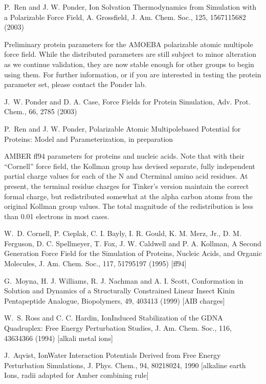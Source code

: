 \documentclass[letterpaper,11pt,english]{sphinxmanual}
\begin{document}
P. Ren and J. W. Ponder, Ion Solvation Thermodynamics from Simulation with a Polarizable Force Field, A. Grossfield, J. Am. Chem. Soc., 125, 15671\sphinxhyphen{}15682 (2003)


Preliminary protein parameters for the AMOEBA polarizable atomic multipole force field. While the distributed parameters are still subject to minor alteration as we continue validation, they are now stable enough for other groups to begin using them. For further information, or if you are interested in testing the protein parameter set, please contact the Ponder lab.

J. W. Ponder and D. A. Case, Force Fields for Protein Simulation, Adv. Prot. Chem., 66, 27\sphinxhyphen{}85 (2003)

P. Ren and J. W. Ponder, Polarizable Atomic Multipole\sphinxhyphen{}based Potential for Proteins: Model and Parameterization, in preparation


AMBER ff94 parameters for proteins and nucleic acids. Note that with their “Cornell” force field, the Kollman group has devised separate, fully independent partial charge values for each of the N\sphinxhyphen{} and C\sphinxhyphen{}terminal amino acid residues. At present, the terminal residue charges for Tinker’s version maintain the correct formal charge, but redistributed somewhat at the alpha carbon atoms from the original Kollman group values. The total magnitude of the redistribution is less than 0.01 electrons in most cases.

W. D. Cornell, P. Cieplak, C. I. Bayly, I. R. Gould, K. M. Merz, Jr., D. M. Ferguson, D. C. Spellmeyer, T. Fox, J. W. Caldwell and P. A. Kollman, A Second Generation Force Field for the Simulation of Proteins, Nucleic Acids, and Organic Molecules, J. Am. Chem. Soc., 117, 5179\sphinxhyphen{}5197 (1995)  {[}ff94{]}

G. Moyna, H. J. Williams, R. J. Nachman and A. I. Scott, Conformation in Solution and Dynamics of a Structurally Constrained Linear Insect Kinin Pentapeptide Analogue, Biopolymers, 49, 403\sphinxhyphen{}413 (1999)  {[}AIB charges{]}

W. S. Ross and C. C. Hardin, Ion\sphinxhyphen{}Induced Stabilization of the G\sphinxhyphen{}DNA Quadruplex: Free Energy Perturbation Studies, J. Am. Chem. Soc., 116, 4363\sphinxhyphen{}4366 (1994)   {[}alkali metal ions{]}

J. Aqvist, Ion\sphinxhyphen{}Water Interaction Potentials Derived from Free Energy Perturbation Simulations, J. Phys. Chem., 94, 8021\sphinxhyphen{}8024, 1990  {[}alkaline earth Ions, radii adapted for Amber combining rule{]}
\end{document}
